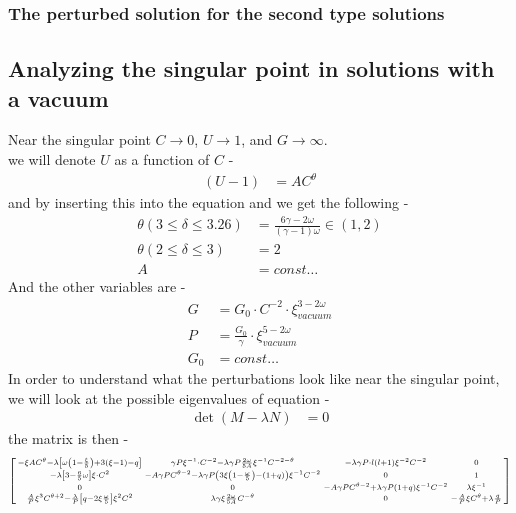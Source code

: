 \documentclass{article}
\begin{document}
\subsubsection{The perturbed solution for the second type solutions}


\subsection{Analyzing the singular point in solutions with a vacuum}
Near the singular point $C \rightarrow 0$, $U \rightarrow 1$, and $G \rightarrow \infty$.\\
we will denote $U$ as a function of $C$ - 
\begin{align}
    \left(U - 1\right) &= A C^{\theta}
\end{align}
and by inserting this into the equation  and we get the following -
\begin{align}
    \theta \left( 3\leq \delta \leq 3.26 \right) &=\frac{6\gamma - 2\omega}{\left(\gamma-1\right)\omega} \in \left( 1,2 \right)\\
    \theta \left( 2 \leq \delta \leq 3 \right) &= 2\\
    A &= const\dots
\end{align}
And the other variables are - 
\begin{align}
    G &= G_{0}\cdot C^{-2}\cdot\xi_{vacuum}^{3-2\omega}\\
    P &= \frac{G_{0}}{\gamma}\cdot\xi_{vacuum}^{5-2\omega}\\
    G_{0} &= const\dots
\end{align}
In order to understand what the perturbations look like near the singular point, we will look at the possible eigenvalues of equation - 
\begin{align}
    \det \left( M - \lambda N \right) &= 0
\end{align}
the matrix is then - 
\begin{align*}
    \begin{bsmallmatrix}-\xi AC^{\theta}-\lambda\left[\omega\left(1-\frac{\xi}{5}\right)+3\left(\xi-1\right)-q\right] & \gamma P\xi^{-1}\cdot C^{-2}-\lambda\gamma P\frac{2\omega}{5A}\xi^{-1}C^{-2-\theta} & -\lambda\gamma P\cdot l\left(l+1\right)\xi^{-2}C^{-2} & 0\\
        -\lambda\left[3-\frac{6}{5}\omega\right]\xi\cdot C^{2} & -A\gamma PC^{\theta-2}-\lambda\gamma P\left(3\xi\left(1-\frac{\omega}{5}\right)-\left(1+q\right)\right)\xi^{-1}C^{-2} & 0 & 1\\
        0 & 0 & -A\gamma PC^{\theta-2}+\lambda\gamma P\left(1+q\right)\xi^{-1}C^{-2} & \lambda\xi^{-1}\\
        \frac{A}{P}\xi^{3}C^{\theta+2}-\frac{\lambda}{P}\left[q-2\xi\frac{\omega}{5}\right]\xi^{2}C^{2} & \lambda\gamma\xi\frac{2\omega}{5A}C^{-\theta} & 0 & -\frac{A}{P}\xi C^{\theta}+\lambda\frac{q}{P}
    \end{bsmallmatrix}
\end{align*}
\end{document}
